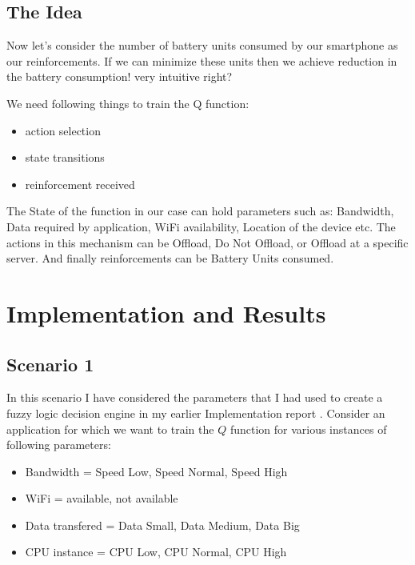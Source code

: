 \documentclass{article}
\begin{document}
\subsection{The Idea}
Now let's consider the number of battery units consumed by our smartphone as our reinforcements. If we can minimize these units then we achieve reduction in the battery consumption! very intuitive right? \par
We need following things to train the Q function:
\begin{itemize}
   \item action selection
   \item state transitions
   \item reinforcement received
\end{itemize}
The State of the function in our case can hold parameters such as: Bandwidth, Data required by application, WiFi availability, Location of the device etc. The actions in this mechanism can be Offload, Do Not Offload, or Offload at a specific server. And finally reinforcements can be Battery Units consumed.\par

\section{Implementation and Results}

\subsection{Scenario 1}
In this scenario I have considered the parameters that I had used to create a fuzzy logic decision engine in my earlier Implementation report \cite{adityaFL}. Consider an application for which we want to train the $Q$ function for various instances of following parameters:
\begin{itemize}
   \item Bandwidth = Speed Low, Speed Normal, Speed High
   \item WiFi = available, not available
   \item Data transfered = Data Small, Data Medium, Data Big
   \item CPU instance = CPU Low, CPU Normal, CPU High
\end{itemize}
\end{document}
